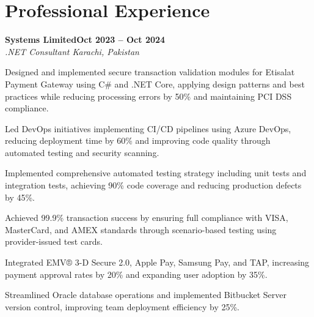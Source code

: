 \documentclass[letterpaper,10pt]{article}
\newcommand{\headingBf}[2]{
  \hspace{10pt}\textbf{#1}\hfill\textbf{#2}\\
}
\newcommand{\headingIt}[2]{
  \hspace{10pt}\textit{#1}\hfill\textit{#2}\\
}
\newenvironment{resume_list}{
  \vspace{-7pt}
  \begin{itemize}[itemsep=-2px, parsep=1pt, leftmargin=30pt]
}{
  \end{itemize}
}
\begin{document}
\section{Professional Experience}

\headingBf{Systems Limited}{Oct 2023 -- Oct 2024}
\headingIt{.NET Consultant \hfill Karachi, Pakistan}{}
\begin{resume_list}
    \item Designed and implemented secure transaction validation modules for Etisalat Payment Gateway using C\# and .NET Core, applying design patterns and best practices while reducing processing errors by 50\% and maintaining PCI DSS compliance.
    \item Led DevOps initiatives implementing CI/CD pipelines using Azure DevOps, reducing deployment time by 60\% and improving code quality through automated testing and security scanning.
    \item Implemented comprehensive automated testing strategy including unit tests and integration tests, achieving 90\% code coverage and reducing production defects by 45\%.
    \item Achieved 99.9\% transaction success by ensuring full compliance with VISA, MasterCard, and AMEX standards through scenario-based testing using provider-issued test cards.
    \item Integrated EMV® 3-D Secure 2.0, Apple Pay, Samsung Pay, and TAP, increasing payment approval rates by 20\% and expanding user adoption by 35\%.
    \item Streamlined Oracle database operations and implemented Bitbucket Server version control, improving team deployment efficiency by 25\%.
\end{resume_list}
\end{document}
